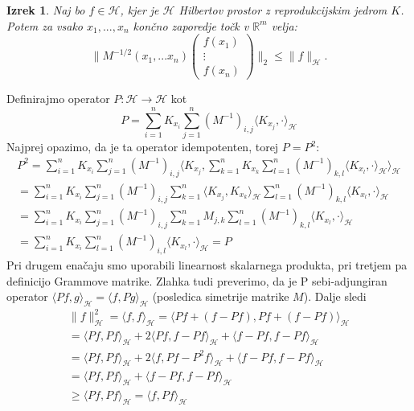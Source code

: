 \documentclass[12pt,a4paper]{amsart}
\theoremstyle{definition} %
\theoremstyle{plain} %
\newtheorem{izrek}[definicija]{Izrek}
\begin{document}
\begin{izrek}
Naj bo $f \in \mathcal{H}$, kjer je $\mathcal{H}$ Hilbertov prostor z reprodukcijskim jedrom $K$. Potem za vsako $x_1, ..., x_n$ končno zaporedje točk v $\mathbb{R}^m$ velja:
$$
\bigg\|M^{-1/2}(x_1,...x_n)
\begin{pmatrix}
  f(x_1)  \\
  \vdots     \\
  f(x_n)
 \end{pmatrix}
\bigg\|_2 \leq \|f\|_{\mathcal{H}}.
$$
\end{izrek}
\proof 
Definirajmo operator $P: \mathcal{H} \rightarrow \mathcal{H}$ kot 
$$
P = \sum_{i=1}^n K_{x_i} \sum_{j=1}^n (M^{-1})_{i,j} \langle K_{x_j}, \cdot \rangle_{\mathcal{H}}
$$
Najprej opazimo, da je ta operator idempotenten, torej $P = P^2$:
\begin{gather*}
P^2 = \sum_{i=1}^n K_{x_i} \sum_{j=1}^n (M^{-1})_{i,j} \langle K_{x_j}, \sum_{k=1}^n K_{x_k} \sum_{l=1}^n (M^{-1})_{k,l} \langle K_{x_l}, \cdot \rangle_{\mathcal{H}} \rangle_{\mathcal{H}} \\
=  \sum_{i=1}^n K_{x_i} \sum_{j=1}^n (M^{-1})_{i,j} \sum_{k=1}^{n}  \langle K_{x_j}, K_{x_k} \rangle_{\mathcal{H}} \sum_{l=1}^n (M^{-1})_{k,l} \langle K_{x_l}, \cdot \rangle_{\mathcal{H}} \\
=  \sum_{i=1}^n K_{x_i} \sum_{j=1}^n (M^{-1})_{i,j}  \sum_{k=1}^n M_{j,k}  \sum_{l=1}^n (M^{-1})_{k,l} \langle K_{x_l}, \cdot \rangle_{\mathcal{H}} 
\\
= \sum_{i=1}^n K_{x_i} \sum_{l=1}^n (M^{-1})_{i,l}  \langle K_{x_l}, \cdot \rangle_{\mathcal{H}}  = P
\end{gather*}
Pri drugem enačaju smo uporabili linearnost skalarnega produkta, pri tretjem pa definicijo Grammove matrike. Zlahka tudi preverimo, da je P sebi-adjungiran operator $\langle Pf, g\rangle_{\mathcal{H}} = \langle f, Pg\rangle_{\mathcal{H}}$ (posledica simetrije matrike $M$). Dalje sledi 
\begin{gather*}
\|f\|_{\mathcal{H}}^2 = \langle f, f\rangle_{\mathcal{H}} = \langle Pf + (f - Pf), Pf + (f - Pf) \rangle_{\mathcal{H}} \\
= \langle Pf, Pf\rangle_{\mathcal{H}} + 2 \langle Pf,f -  Pf\rangle_{\mathcal{H}} + \langle f - Pf, f - Pf\rangle_{\mathcal{H}} \\
= \langle Pf, Pf\rangle_{\mathcal{H}} + 2 \langle f,Pf -  P^2 f\rangle_{\mathcal{H}} + \langle f - Pf, f - Pf\rangle_{\mathcal{H}} \\
= \langle Pf, Pf\rangle_{\mathcal{H}} +  \langle f - Pf, f - Pf\rangle_{\mathcal{H}} \\
\geq \langle Pf, Pf\rangle_{\mathcal{H}} = \langle f, Pf\rangle_{\mathcal{H}}
\end{gather*}
\end{document}
